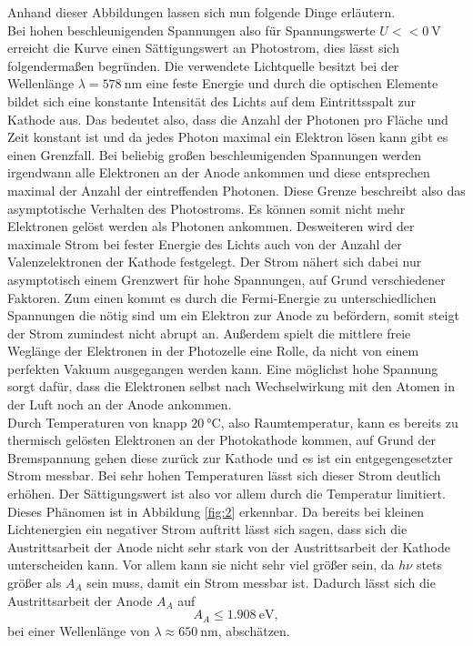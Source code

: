 Anhand dieser Abbildungen lassen sich nun folgende Dinge erläutern. 
\\
Bei hohen beschleunigenden Spannungen also für Spannungswerte $U << \SI{0}{\volt}$ erreicht die Kurve einen Sättigungswert an Photostrom, dies lässt sich folgendermaßen begründen. 
Die verwendete Lichtquelle besitzt bei der Wellenlänge $\lambda = \SI{578}{\nano\meter}$ eine feste Energie und durch die optischen Elemente bildet sich eine konstante Intensität des Lichts auf dem Eintrittsspalt zur Kathode aus. Das bedeutet also,
dass die Anzahl der Photonen pro Fläche und Zeit konstant ist und da jedes Photon maximal ein Elektron lösen kann gibt es einen Grenzfall. Bei beliebig großen beschleunigenden Spannungen werden irgendwann alle Elektronen an der Anode ankommen und diese entsprechen maximal der Anzahl der eintreffenden Photonen. Diese Grenze beschreibt
also das asymptotische Verhalten des Photostroms. Es können somit nicht mehr Elektronen gelöst werden als Photonen ankommen. Desweiteren wird der maximale Strom bei fester Energie des Lichts auch von der Anzahl der Valenzelektronen der Kathode festgelegt.
Der Strom nähert sich dabei nur asymptotisch einem Grenzwert für hohe Spannungen, auf Grund verschiedener Faktoren. Zum einen kommt es durch die Fermi-Energie zu unterschiedlichen Spannungen die nötig sind um ein Elektron zur Anode zu befördern, somit steigt der Strom zumindest nicht abrupt an. Außerdem spielt die mittlere freie
Weglänge der Elektronen in der Photozelle eine Rolle, da nicht von einem perfekten Vakuum ausgegangen werden kann. Eine möglichst hohe Spannung sorgt dafür, dass die Elektronen selbst nach Wechselwirkung mit den Atomen in der Luft noch an der Anode ankommen.
\\
Durch Temperaturen von knapp $\SI{20}{\celsius}$, also Raumtemperatur, kann es bereits zu thermisch gelösten Elektronen an der Photokathode kommen, auf Grund der Bremspannung gehen diese zurück zur Kathode und es ist ein entgegengesetzter Strom messbar. Bei sehr hohen Temperaturen lässt sich
dieser Strom deutlich erhöhen. Der Sättigungswert ist also vor allem durch die Temperatur limitiert. Dieses Phänomen ist in Abbildung \ref{fig:2} erkennbar. Da bereits bei kleinen Lichtenergien ein negativer Strom auftritt lässt sich sagen, dass sich die Austrittsarbeit der Anode nicht sehr stark von der Austrittsarbeit der Kathode unterscheiden kann.
Vor allem kann sie nicht sehr viel größer sein, da $h\nu$ stets größer als $A_A$ sein muss, damit ein Strom messbar ist. Dadurch lässt sich die Austrittsarbeit der Anode $A_A$ auf 
\begin{equation}
A_A \leq \SI{1.908}{\electronvolt},
\end{equation}
bei einer Wellenlänge von $\lambda \approx \SI{650}{\nano\meter}$, abschätzen.